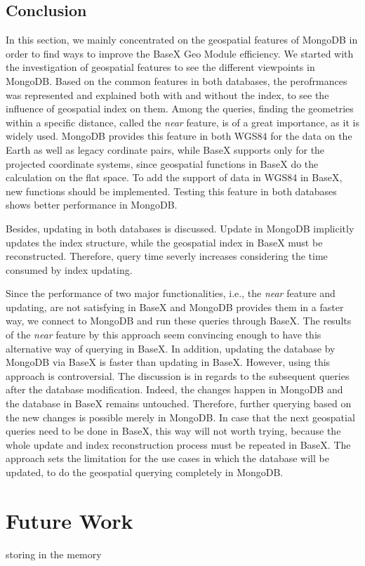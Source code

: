 \documentclass[a4paper,12pt]{article}
\begin{document}
\subsection{Conclusion}
\label{conc}
In this section, we mainly concentrated on the geospatial features of MongoDB in order to find ways to improve the BaseX Geo Module efficiency. We started with the investigation of geospatial features to see the different viewpoints in MongoDB. Based on the common features in both databases, the perofrmances was represented and explained both with and without the index, to see the influence of geospatial index on them.
Among the queries, finding the geometries within a specific distance, called the \textit{near} feature, is of a great importance, as it is widely used. MongoDB provides this feature in both WGS84 for the data on the Earth as well as legacy cordinate pairs, while BaseX supports only for the projected coordinate systems, since geospatial functions in BaseX do the calculation on the flat space. To add the support of data in WGS84 in BaseX, new functions should be implemented. Testing this feature in both databases shows better performance in MongoDB. 

Besides, updating in both databases is discussed. Update in MongoDB implicitly updates the index structure, while the geospatial index in BaseX must be reconstructed. Therefore, query time severly increases considering the time consumed by index updating. 


Since the performance of two major functionalities, i.e., the \textit{near} feature and updating, are not satisfying in BaseX and MongoDB provides them in a faster way, we connect to MongoDB and run these queries through BaseX. The results of the \textit{near} feature by this approach seem convincing enough to have this alternative way of querying in BaseX. In addition, updating the database by MongoDB via BaseX is faster than updating in BaseX. However, using this approach is controversial. The discussion is in regards to the subsequent queries after the database modification. Indeed, the changes happen in MongoDB and the database in BaseX remains untouched. Therefore, further querying based on the new changes is possible merely in MongoDB. In case that the next geospatial queries need to be done in BaseX, this way will not worth trying, because the whole update and index reconstruction process must be repeated in BaseX. The approach sets the limitation for the use cases in which the database will be updated, to do the geospatial querying completely in MongoDB.


\newpage
\section{Future Work}
\label{s.future}
storing in the memory
\newpage


\newpage
\listoffigures
\newpage
\listoftables
\newpage
\lstlistoflistings
\end{document}
